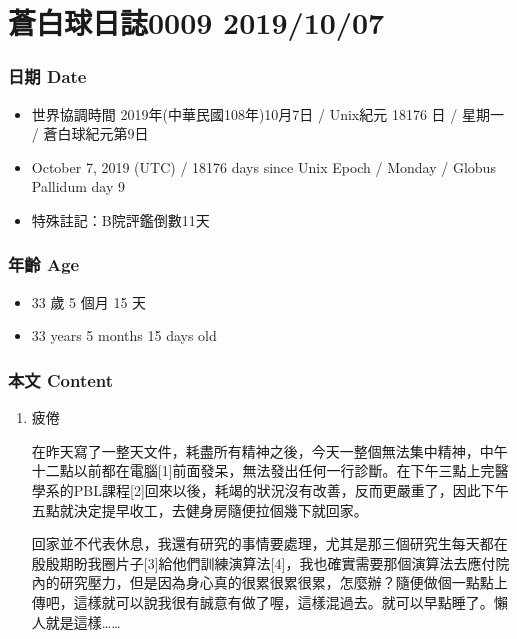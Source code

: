 \documentclass[
]{article}
\providecommand{\tightlist}{%
  \setlength{\itemsep}{0pt}\setlength{\parskip}{0pt}}
\begin{document}
\hypertarget{ux84bcux767dux7403ux65e5ux8a8c0009-20191007}{%
\section{蒼白球日誌0009
2019/10/07}\label{ux84bcux767dux7403ux65e5ux8a8c0009-20191007}}

\hypertarget{ux65e5ux671f-date-8}{%
\subsubsection{日期 Date}\label{ux65e5ux671f-date-8}}

\begin{itemize}
\tightlist
\item
  世界協調時間 2019年(中華民國108年)10月7日 / Unix紀元 18176 日 / 星期一
  / 蒼白球紀元第9日
\item
  October 7, 2019 (UTC) / 18176 days since Unix Epoch / Monday / Globus
  Pallidum day 9
\item
  特殊註記：B院評鑑倒數11天
\end{itemize}

\hypertarget{ux5e74ux9f61-age-8}{%
\subsubsection{年齡 Age}\label{ux5e74ux9f61-age-8}}

\begin{itemize}
\tightlist
\item
  33 歲 5 個月 15 天
\item
  33 years 5 months 15 days old
\end{itemize}

\hypertarget{ux672cux6587-content-8}{%
\subsubsection{本文 Content}\label{ux672cux6587-content-8}}

\begin{enumerate}
\def\labelenumi{\arabic{enumi}.}
\item
  疲倦

  在昨天寫了一整天文件，耗盡所有精神之後，今天一整個無法集中精神，中午十二點以前都在電腦{[}1{]}前面發呆，無法發出任何一行診斷。在下午三點上完醫學系的PBL課程{[}2{]}回來以後，耗竭的狀況沒有改善，反而更嚴重了，因此下午五點就決定提早收工，去健身房隨便拉個幾下就回家。

  回家並不代表休息，我還有研究的事情要處理，尤其是那三個研究生每天都在殷殷期盼我圈片子{[}3{]}給他們訓練演算法{[}4{]}，我也確實需要那個演算法去應付院內的研究壓力，但是因為身心真的很累很累很累，怎麼辦？隨便做個一點點上傳吧，這樣就可以說我很有誠意有做了喔，這樣混過去。就可以早點睡了。懶人就是這樣\ldots\ldots{}
\end{enumerate}
\end{document}
